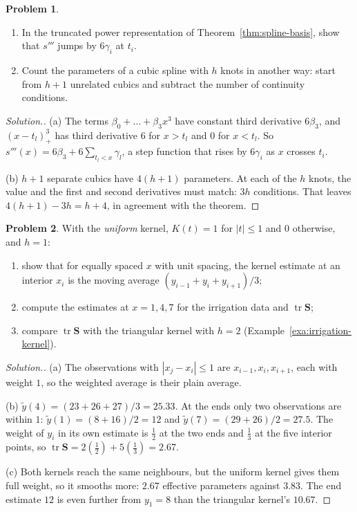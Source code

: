 \documentclass[11pt,a4paper]{article}
\numberwithin{equation}{section}
\theoremstyle{definition}
\newtheorem{problemx}{Problem}[subsection]
\newenvironment{problem}{\begin{problemx}}{\end{problemx}}
\newenvironment{solution}
  {\renewcommand{\qedsymbol}{}\begin{proof}[\textit{Solution}.]}
  {\end{proof}}
\begin{document}
\begin{problem}\label{prob:spline-jump}
\begin{enumerate}[label=(\alph*)]
\item In the truncated power representation of Theorem~\ref{thm:spline-basis}, show that $s'''$ jumps by $6\gamma_i$ at $t_i$.
\item Count the parameters of a cubic spline with $h$ knots in another way: start from $h + 1$ unrelated cubics and
subtract the number of continuity conditions.
\end{enumerate}
\end{problem}

\begin{solution}
(a) The terms $\beta_0 + \dots + \beta_3x^3$ have constant third derivative $6\beta_3$, and $(x - t_l)_+^3$ has third derivative
$6$ for $x > t_l$ and $0$ for $x < t_l$. So $s'''(x) = 6\beta_3 + 6\sum_{t_l < x}\gamma_l$, a step function that rises by $6\gamma_i$ as $x$ crosses $t_i$.

(b) $h + 1$ separate cubics have $4(h + 1)$ parameters. At each of the $h$ knots, the value and the first and second
derivatives must match: $3h$ conditions. That leaves $4(h + 1) - 3h = h + 4$, in agreement with the theorem.
\end{solution}

\begin{problem}\label{prob:moving-average}
With the \emph{uniform} kernel, $K(t) = 1$ for $|t| \le 1$ and $0$ otherwise, and $h = 1$:
\begin{enumerate}[label=(\alph*)]
\item show that for equally spaced $x$ with unit spacing, the kernel estimate at an interior $x_i$ is the moving
average $(y_{i-1} + y_i + y_{i+1})/3$;
\item compute the estimates at $x = 1, 4, 7$ for the irrigation data and $\operatorname{tr}\mathbf{S}$;
\item compare $\operatorname{tr}\mathbf{S}$ with the triangular kernel with $h = 2$ (Example~\ref{exa:irrigation-kernel}).
\end{enumerate}
\end{problem}

\begin{solution}
(a) The observations with $|x_j - x_i| \le 1$ are $x_{i-1}, x_i, x_{i+1}$, each with weight $1$, so the weighted average is their
plain average.

(b) $\tilde y(4) = (23 + 26 + 27)/3 = 25.33$. At the ends only two observations are within $1$:
$\tilde y(1) = (8 + 16)/2 = 12$ and $\tilde y(7) = (29 + 26)/2 = 27.5$. The weight of $y_i$ in its own estimate is $\frac12$ at the two
ends and $\frac13$ at the five interior points, so $\operatorname{tr}\mathbf{S} = 2(\frac12) + 5(\frac13) = 2.67$.

(c) Both kernels reach the same neighbours, but the uniform kernel gives them full weight, so it smooths more:
$2.67$ effective parameters against $3.83$. The end estimate $12$ is even further from $y_1 = 8$ than the triangular
kernel's $10.67$.
\end{solution}
\end{document}
